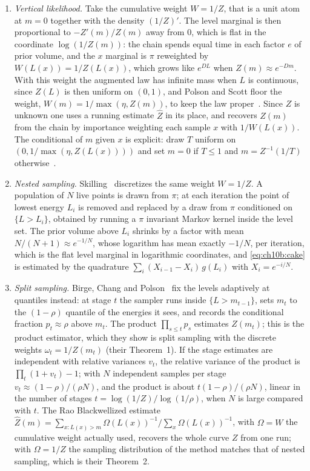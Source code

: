 \begin{enumerate}[label=(\roman*),leftmargin=2em]
\item \emph{Vertical likelihood.} Take the cumulative weight $W=1/Z$, that is a unit atom at $m=0$ together with the density $(1/Z)'$. The level marginal is then proportional to $-Z'(m)/Z(m)$ away from $0$, which is flat in the coordinate $\log(1/Z(m))$: the chain spends equal time in each factor $e$ of prior volume, and the $x$ marginal is $\pi$ reweighted by $W(L(x))=1/Z(L(x))$, which grows like $e^{DL}$ when $Z(m)\approx e^{-Dm}$. With this weight the augmented law has infinite mass when $L$ is continuous, since $Z(L)$ is then uniform on $(0,1)$, and Polson and Scott floor the weight, $W(m)=1/\max(\eta,Z(m))$, to keep the law proper~\cite[eq.~(19)]{polsonscott2015}. Since $Z$ is unknown one uses a running estimate $\hat Z$ in its place, and recovers $Z(m)$ from the chain by importance weighting each sample $x$ with $1/W(L(x))$.
  The conditional of $m$ given $x$
  is explicit: draw $T$ uniform on $(0,1/\max(\eta,Z(L(x))))$ and set $m=0$ if
  $T\le1$ and $m=Z^{-1}(1/T)$ otherwise~\cite[Lemma 3]{polsonscott2015}.
\item \emph{Nested sampling.} Skilling~\cite{skilling2006} discretizes the
  same weight $W=1/Z$. A population of $N$ live points is drawn from
  $\pi$; at each iteration the point of lowest energy $L_i$ is removed and
  replaced by a draw from $\pi$ conditioned on $\{L>L_i\}$, obtained by running
  a $\pi$ invariant Markov kernel inside the level set. The prior volume above
  $L_i$ shrinks by a factor with mean $N/(N+1)\approx e^{-1/N}$, whose logarithm has mean exactly $-1/N$, per iteration,
  which is the flat level marginal in logarithmic coordinates, and
  \eqref{eq:ch10b:cake} is estimated by the quadrature
  $\sum_i(X_{i-1}-X_i)\,g(L_i)$ with $X_i=e^{-i/N}$.
\item \emph{Split sampling.} Birge, Chang and Polson~\cite{birge2013} fix the
  levels adaptively at quantiles instead: at stage $t$ the sampler runs inside
  $\{L>m_{t-1}\}$, sets $m_t$ to the $(1-\rho)$ quantile of the energies it
  sees, and records the conditional fraction $p_t\approx\rho$ above $m_t$. The
  product $\prod_{s\le t}p_s$ estimates $Z(m_t)$; this is the product estimator, which they show is split sampling with the discrete weights $\omega_t=1/Z(m_t)$ (their Theorem~1).
  If the stage estimates are independent with relative variances $v_t$, the relative variance of the product is $\prod_t(1+v_t)-1$; with $N$ independent samples per stage $v_t\approx(1-\rho)/(\rho N)$, and the product is about $t(1-\rho)/(\rho N)$, linear in the number of stages $t=\log(1/Z)/\log(1/\rho)$, when $N$ is large compared with $t$.
  The Rao
  Blackwellized estimate
  $\hat Z(m)=\sum_{x:L(x)>m}\Omega(L(x))^{-1}\big/\sum_x\Omega(L(x))^{-1}$,
  with $\Omega=W$ the cumulative weight actually used, recovers the whole curve $Z$ from
  one run; with $\Omega=1/Z$ the sampling distribution of the method matches that of nested sampling, which
  is their Theorem~2.
\end{enumerate}

